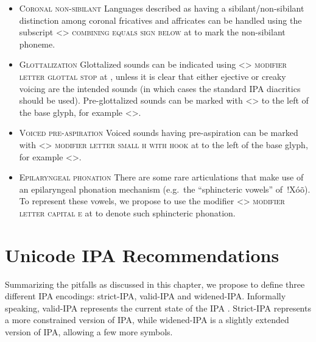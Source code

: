 \begin{itemize}
\item \textsc{Coronal non-sibilant} \newline
      Languages described as having a sibilant/non-sibilant distinction among
      coronal fricatives and affricates can be handled using the subscript
      <> \textsc{combining equals sign below} at  to mark
      the non-sibilant phoneme.
\item \textsc{Glottalization} \newline 
      Glottalized sounds can be indicated using
      <> \textsc{modifier letter glottal stop} at , unless
      it is clear that either ejective or creaky voicing are the
      intended sounds (in which cases the standard IPA diacritics should be
      used). Pre-glottalized sounds can be marked with
      <> to the left of the base
      glyph, for example <>.
\item \textsc{Voiced pre-aspiration} \newline Voiced sounds having
      pre-aspiration can be marked with
      <> \textsc{modifier letter
      small h with hook} at  to the left of the base glyph, for
      example <>.
\item \textsc{Epilaryngeal phonation} \newline 
      There are some rare articulations that make
      use of an epilaryngeal phonation mechanism (e.g.\ the “sphincteric vowels”
      of~!Xóõ). To represent these vowels, we propose to use the modifier <>
      \textsc{modifier letter capital e} at  to denote such sphincteric
      phonation.

\end{itemize}


\section{Unicode IPA Recommendations}
\label{ipa-recommendations}


Summarizing the pitfalls as discussed in this chapter, we propose to define
three different IPA encodings: strict-IPA, valid-IPA and widened-IPA.\@
Informally speaking, valid-IPA represents the current state of the IPA
\citep{IPA2015}. Strict-IPA represents a more constrained version of IPA, while
widened-IPA is a slightly extended version of IPA, allowing a few more symbols.

